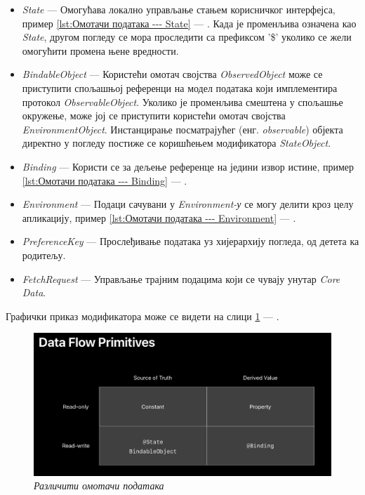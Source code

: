 \documentclass[12pt,oneside]{memoir}
\begin{document}
\begin{itemize}
    \item \textit{State} --- Омогућава локално управљање стањем корисничког интерфејса, пример \ref{lst:Омотачи података --- State} --- . Када је променљива означена као \textit{State}, другом погледу се мора проследити са префиксом '\$' уколико се жели омогућити промена њене вредности.
    \item \textit{BindableObject} --- Користећи омотач својства \textit{ObservedObject}  може се приступити спољашњој референци на модел података који имплементира протокол \textit{ObservableObject}. Уколико је променљива смештена у спољашње окружење, може јој се приступити користећи омотач својства \textit{EnvironmentObject}. Инстанцирање посматрајућег (енг. \textit{observable}) објекта директно у погледу постиже се коришћењем модификатора \textit{State\-Object}.
    \item \textit{Binding} --- Користи се за дељење референце на једини извор истине, пример \ref{lst:Омотачи података --- Binding} --- .
    \item \textit{Environment} --- Подаци сачувани у \textit{Environment-у} се могу делити кроз целу апликацију, пример \ref{lst:Омотачи података --- Environment} --- .
    \item \textit{PreferenceKey} --- Прослеђивање података уз хијерархију погледа, од детета ка родитељу.
    \item \textit{FetchRequest} --- Управљање трајним подацима који се чувају унутар \textit{Core Data}.
\end{itemize}

Графички приказ модификатора може се видети на слици \ref{slika:data_flow_primitives} --- .

\begin{figure}[H]
\includegraphics[width=1\textwidth]{images/DataFlowPrimitives.png}
\centering
\caption{\textit{Различити омотачи података}}
\label{slika:data_flow_primitives}
\end{figure}
\end{document}
